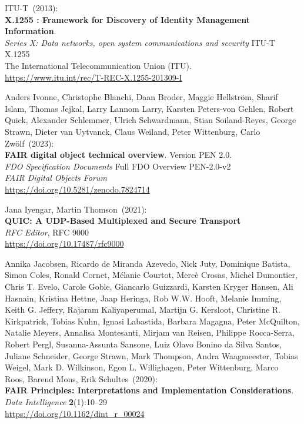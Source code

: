 \begin{thebibliography}{9}
ITU-T~(2013): \\
\textbf{X.1255 : Framework for Discovery of Identity Management Information}.\\
\emph{Series X: Data networks, open system communications and security} ITU-T X.1255 \\
The International Telecommunication Union (ITU).\\
\url{https://www.itu.int/rec/T-REC-X.1255-201309-I}

Anders Ivonne, Christophe Blanchi, Daan Broder, Maggie Hellström, Sharif Islam, Thomas Jejkal, Larry Lannom Larry, Karsten Peters-von Gehlen, Robert Quick, Alexander Schlemmer, Ulrich Schwardmann, Stian Soiland-Reyes, George Strawn, Dieter van Uytvanck, Claus Weiland, Peter Wittenburg, Carlo Zwölf~(2023): \\
\textbf{{FAIR} digital object technical overview}. Version PEN 2.0.\\
\emph{FDO Specification Documents} Full FDO Overview PEN-2.0-v2 \\
\emph{FAIR Digital Objects Forum}\\
\url{https://doi.org/10.5281/zenodo.7824714}

Jana Iyengar, Martin Thomson~(2021): \\
\textbf{{QUIC}: {A UDP-Based Multiplexed} and {Secure Transport}}\\
\emph{RFC Editor}, RFC 9000\\
\url{https://doi.org/10.17487/rfc9000}

Annika Jacobsen, Ricardo de Miranda Azevedo, Nick Juty, Dominique Batista, Simon Coles, Ronald Cornet, Mélanie Courtot, Mercè Crosas, Michel Dumontier, Chris T. Evelo, Carole Goble, Giancarlo Guizzardi, Karsten Kryger Hansen, Ali Hasnain, Kristina Hettne, Jaap Heringa, Rob W.W. Hooft, Melanie Imming, Keith G. Jeffery, Rajaram Kaliyaperumal, Martijn G. Kersloot, Christine R. Kirkpatrick, Tobias Kuhn, Ignasi Labastida, Barbara Magagna, Peter McQuilton, Natalie Meyers, Annalisa Montesanti, Mirjam van Reisen, Philippe Rocca-Serra, Robert Pergl, Susanna-Assunta Sansone, Luiz Olavo Bonino da Silva Santos, Juliane Schneider, George Strawn, Mark Thompson, Andra Waagmeester, Tobias Weigel, Mark D. Wilkinson, Egon L. Willighagen, Peter Wittenburg, Marco Roos, Barend Mons, Erik Schultes~(2020): \\
\textbf{FAIR Principles: Interpretations and Implementation Considerations}.\\
\emph{Data Intelligence} \textbf{2}(1):10--29\\
\url{https://doi.org/10.1162/dint_r_00024}


\end{thebibliography}
